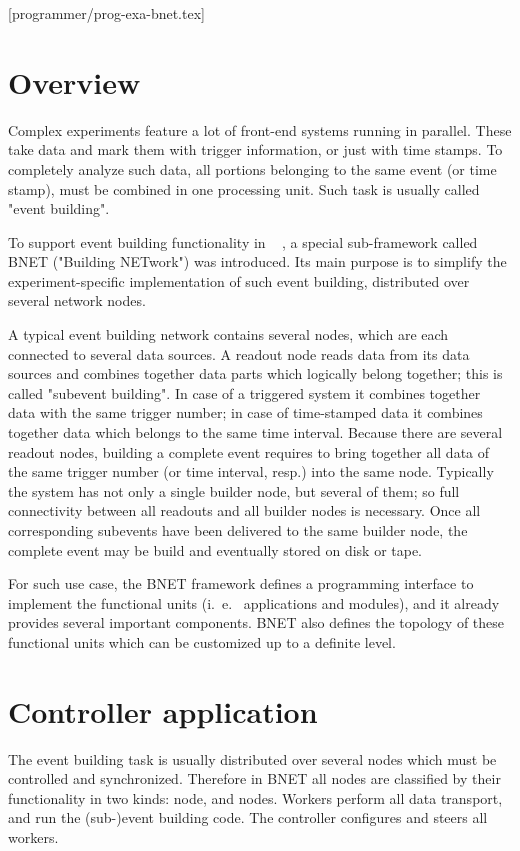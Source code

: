 [programmer/prog-exa-bnet.tex]
\label{prog_exabnet}
\section{Overview}

Complex experiments feature a lot of front-end systems running in parallel.
These take data and mark them with trigger information, or just with time stamps.
To completely analyze such data, all portions belonging to the same event 
(or time stamp), must be combined in one processing unit. 
Such task is usually called "event building".

To support event building functionality in \dabc~ , a special sub-framework called 
BNET ("Building NETwork") was introduced. 
Its main purpose is to simplify the experiment-specific implementation of  
such event building, distributed over several network nodes.

A typical event building network contains several  nodes, 
which are each connected to several data sources.
A readout node reads data from its data sources and combines
together data parts which logically belong together; this is called "subevent building".
In case of a triggered system it combines together data with the same trigger number;
in case of time-stamped data it combines together data which belongs to the same 
time interval. 
Because there are several readout nodes, building a complete event requires to 
bring together all data of the same trigger number (or time interval, resp.) 
into the same  node. 
Typically the system has not only a single builder node, 
but several of them; so full connectivity between all readouts and 
all builder nodes is necessary.
Once all corresponding subevents have been delivered to the same builder node, 
the complete event may be build and eventually stored on disk or tape. 

For such use case,
the BNET framework defines a programming interface 
to implement the functional units (i.~e.~ applications and modules), 
and it already provides several important components.
BNET also defines the topology of these functional units
which can be customized up to a definite level.


\section{Controller application}

The event building task is usually distributed over several nodes 
which must be controlled and synchronized.
Therefore in BNET all nodes are classified by their functionality 
in two kinds:  node, and
 nodes. Workers perform all 
data transport, and run the (sub-)event building code. 
The controller configures and steers all workers. 


